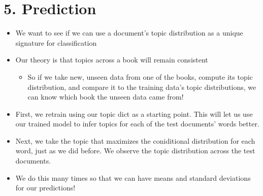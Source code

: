 \documentclass{article}
\begin{document}
    \section{5. Prediction}\label{prediction}

    \begin{itemize}
\itemsep1pt\parskip0pt
\item
  We want to see if we can use a document's topic distribution as a
  unique signature for classification
\item
  Our theory is that topics across a book will remain consistent

  \begin{itemize}
  \itemsep1pt\parskip0pt
  \item
    So if we take new, unseen data from one of the books, compute its
    topic distribution, and compare it to the training data's topic
    distributions, we can know which book the unseen data came from!
  \end{itemize}
\item
  First, we retrain using our topic dict as a starting point. This will
  let us use our trained model to infer topics for each of the test
  documents' words better.
\item
  Next, we take the topic that maximizes the coniditional distribution
  for each word, just as we did before. We observe the topic
  distribution across the test documents.
\item
  We do this many times so that we can have means and standard
  deviations for our predictions!
\end{itemize}
\end{document}
